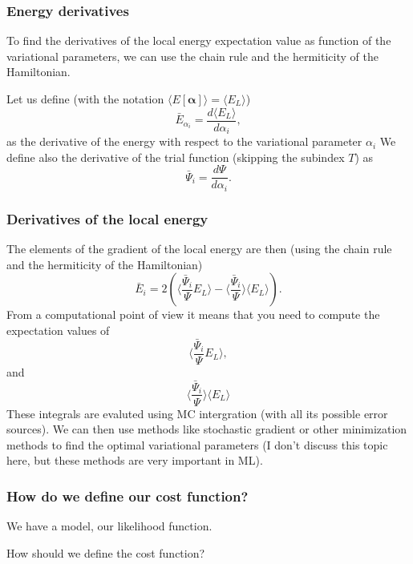 \documentclass{beamer}
\begin{document}
\begin{frame}
\frametitle{Energy derivatives}

\begin{block}{}
To find the derivatives of the local energy expectation value as function of the variational parameters, we can use the chain rule and the hermiticity of the Hamiltonian.  

Let us define (with the notation $\langle E[\bm{\alpha}]\rangle =\langle  E_L\rangle$)
\[
\bar{E}_{\alpha_i}=\frac{d\langle  E_L\rangle}{d\alpha_i},
\]
as the derivative of the energy with respect to the variational parameter $\alpha_i$
We define also the derivative of the trial function (skipping the subindex $T$) as 
\[
\bar{\Psi}_{i}=\frac{d\Psi}{d\alpha_i}.
\]
\end{block}
\end{frame}

\begin{frame}
\frametitle{Derivatives of the local energy}

\begin{block}{}
The elements of the gradient of the local energy are then (using the chain rule and the hermiticity of the Hamiltonian)
\[
\bar{E}_{i}= 2\left( \langle \frac{\bar{\Psi}_{i}}{\Psi}E_L\rangle -\langle \frac{\bar{\Psi}_{i}}{\Psi}\rangle\langle E_L \rangle\right).
\]
From a computational point of view it means that you need to compute the expectation values of 
\[
\langle \frac{\bar{\Psi}_{i}}{\Psi}E_L\rangle,
\]
and
\[
\langle \frac{\bar{\Psi}_{i}}{\Psi}\rangle\langle E_L\rangle
\]
These integrals are evaluted using MC intergration (with all its possible error sources). 
We can then use methods like stochastic gradient or other minimization methods to find the optimal variational parameters (I don't discuss this topic here, but these methods are very important in ML). 
\end{block}
\end{frame}

\begin{frame}
\frametitle{How do we define our cost function?}

\begin{block}{}
We have a model, our likelihood function. 

How should we define the cost function?

\end{block}
\end{frame}
\end{document}
